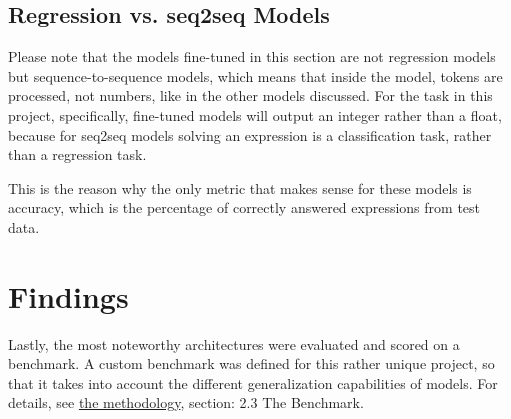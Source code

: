 \documentclass{article}
\begin{document}
\subsection{Regression vs. seq2seq Models}
Please note that the models fine-tuned in this section are not regression models but sequence-to-sequence models, which means that inside the model, tokens are processed, not numbers, like in the other models discussed. For the task in this project, specifically, fine-tuned models will output an integer rather than a float, because for seq2seq models solving an expression is a classification task, rather than a regression task. 

This is the reason why the only metric that makes sense for these models is accuracy, which is the percentage of correctly answered expressions from test data.

\section{Findings}
Lastly, the most noteworthy architectures were evaluated and scored on a benchmark. A custom benchmark was defined for this rather unique project, so that it takes into account the different generalization capabilities of models. For details, see \href{https://github.com/AntonStantan/matura/blob/main/documentation/methodology/methodology.pdf}{the methodology}, section: 2.3 The Benchmark. 
\end{document}
